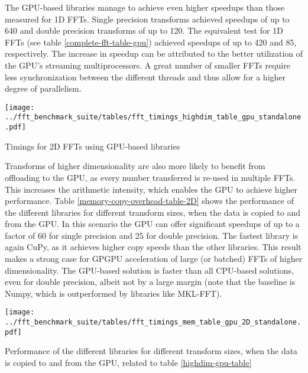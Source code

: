 \documentclass[english,11pt,a4paper,table]{article} %
\begin{document}
The GPU-based libraries manage to achieve even higher speedups than those measured for 1D FFTs.
Single precision transforms achieved speedups of up to 640 and double precision transforms of up to 120.
The equivalent test for 1D FFTs (see table \ref{complete-fft-table-gpu}) achieved speedups of up to 420 and 85, respectively.
The increase in speedup can be attributed to the better utilization of the GPU's streaming multiprocessors.
A great number of smaller FFTs require less synchronization between the different threads and thus allow for a higher degree of parallelism. 

\begin{table}[H]
	\centering
	\texttt{[image: ../fft\_benchmark\_suite/tables/fft\_timings\_highdim\_table\_gpu\_standalone.pdf]}
	\caption{Timings for 2D FFTs using GPU-based libraries}
	\label{highdim-gpu-table}
\end{table}

Transforms of higher dimensionality are also more likely to benefit from offloading to the GPU, as every number transferred is re-used in multiple FFTs.
This increases the arithmetic intensity, which enables the GPU to achieve higher performance.
Table \ref{memory-copy-overhead-table-2D} shows the performance of the different libraries for different transform sizes, when the data is copied to and from the GPU.
In this scenario the GPU can offer significant speedups of up to a factor of 60 for single precision and 25 for double precision.
The fastest library is again CuPy, as it achieves higher copy speeds than the other libraries.
This result makes a strong case for GPGPU acceleration of large (or batched) FFTs of higher dimensionality.
The GPU-based solution is faster than all CPU-based solutions, even for double precision, albeit not by a large margin (note that the baseline is Numpy, which is outperformed by libraries like MKL-FFT).

\begin{table}[H]
	\centering
	\texttt{[image: ../fft\_benchmark\_suite/tables/fft\_timings\_mem\_table\_gpu\_2D\_standalone.pdf]}
	\caption{Performance of the different libraries for different transform sizes, when the data is copied to and from the GPU, related to table \ref{highdim-gpu-table}}
	\label{memory-copy-overhead-table-2D}
\end{table}
\end{document}
